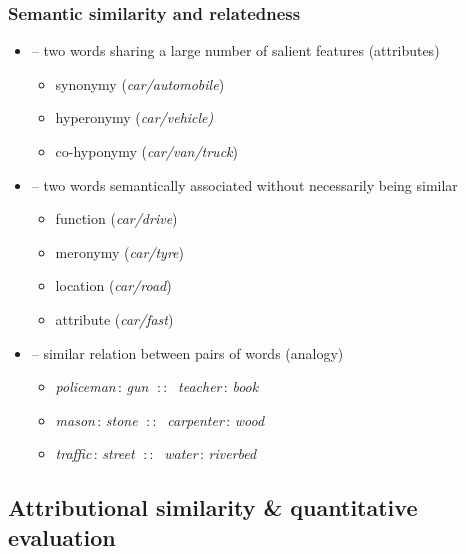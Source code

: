 \documentclass[t]{beamer} %
\begin{document}
\begin{frame}
\frametitle{Semantic similarity and relatedness}

\ungap[1]
\begin{itemize}
\item {} -- two words sharing a large number of salient features (attributes)
\begin{itemize}
\item synonymy (\emph{car/automobile})
\item hyperonymy (\emph{car/vehicle)}
\item co-hyponymy (\emph{car/van/truck})
\end{itemize}

\item<2->  \citep{Budanitsky:Hirst:06} -- two words semantically associated without necessarily being similar
\begin{itemize}
\item function (\emph{car/drive})
\item meronymy (\emph{car/tyre})
\item location (\emph{car/road})
\item attribute (\emph{car/fast})
\end{itemize}

\item<3->  \citep{Turney:06} -- similar relation between pairs of words (analogy)
  \begin{itemize}
  \item \emph{policeman}$\,:\,$\emph{gun} $\;::\;$ \emph{teacher}$\,:\,$\emph{book}
  \item \emph{mason}$\,:\,$\emph{stone} $\;::\;$ \emph{carpenter}$\,:\,$\emph{wood}
  \item \emph{traffic}$\,:\,$\emph{street} $\;::\;$ \emph{water}$\,:\,$\emph{riverbed}
  \end{itemize}
\end{itemize}
\end{frame}

\subsection{Attributional similarity \& quantitative evaluation}
\end{document}
